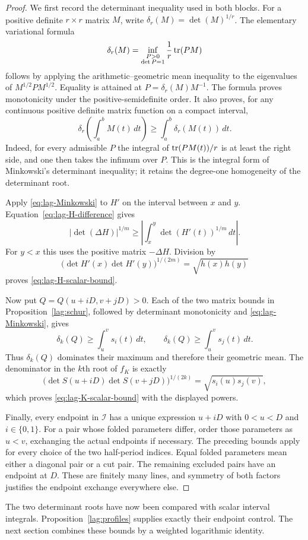 \begin{proof}
We first record the determinant inequality used in both blocks.  For
a positive definite $r\times r$ matrix $M$, write
$\delta_r(M)=\det(M)^{1/r}$.  The elementary variational formula
\begin{equation}
 \delta_r(M)=
 \inf_{\substack{P>0\\\det P=1}}\frac1r\operatorname{tr}(PM)
 \label{eq:lag-determinant-variational}
\end{equation}
follows by applying the arithmetic--geometric mean inequality to the
eigenvalues of $M^{1/2}PM^{1/2}$.  Equality is attained at
$P=\delta_r(M)M^{-1}$.  The formula proves monotonicity under the
positive-semidefinite order.  It also proves, for any continuous
positive definite matrix function on a compact interval,
\begin{equation}
 \delta_r\left(\int_a^b M(t)\,dt\right)
 \ge\int_a^b\delta_r(M(t))\,dt.
 \label{eq:lag-Minkowski}
\end{equation}
Indeed, for every admissible $P$ the integral of
$\operatorname{tr}(PM(t))/r$ is at least the right side, and one then takes the
infimum over $P$.  This is the integral form of Minkowski's determinant
inequality; it retains the degree-one homogeneity of the determinant
root.

Apply \eqref{eq:lag-Minkowski} to $H'$ on the interval between $x$ and
$y$.  Equation~\eqref{eq:lag-H-difference} gives
\[
 |\det(\Delta H)|^{1/m}
 \ge\left|\int_x^y\det(H'(t))^{1/m}\,dt\right|.
\]
For $y<x$ this uses the positive matrix $-\Delta H$.  Division by
\[
 \bigl(\det H'(x)\det H'(y)\bigr)^{1/(2m)}
 =\sqrt{h(x)h(y)}
\]
proves \eqref{eq:lag-H-scalar-bound}.

Now put $Q=Q(u+iD,v+jD)>0$.  Each of the two matrix bounds in
Proposition~\ref{lag:schur}, followed by determinant monotonicity and
\eqref{eq:lag-Minkowski}, gives
\[
 \delta_k(Q)\ge\int_u^v s_i(t)\,dt,
 \qquad
 \delta_k(Q)\ge\int_u^v s_j(t)\,dt.
\]
Thus $\delta_k(Q)$ dominates their maximum and therefore their
geometric mean.  The denominator in the $k$th root of $f_K$ is exactly
\[
 \bigl(\det S(u+iD)\det S(v+jD)\bigr)^{1/(2k)}
 =\sqrt{s_i(u)s_j(v)},
\]
which proves \eqref{eq:lag-K-scalar-bound} with the displayed powers.

Finally, every endpoint in $\mathcal I$ has a unique expression
$u+iD$ with $0<u<D$ and $i\in\{0,1\}$.  For a pair whose folded
parameters differ, order those parameters as $u<v$, exchanging the
actual endpoints if necessary.  The preceding bounds apply for every
choice of the two half-period indices.  Equal folded parameters mean
either a diagonal pair or a cut pair.  The remaining excluded pairs
have an endpoint at $D$.  These are finitely many lines, and symmetry
of both factors justifies the endpoint exchange everywhere else.
\end{proof}

The two determinant roots have now been compared with scalar interval
integrals.  Proposition~\ref{lag:profiles} supplies exactly their
endpoint control.  The next section combines these bounds by a weighted
logarithmic identity.
